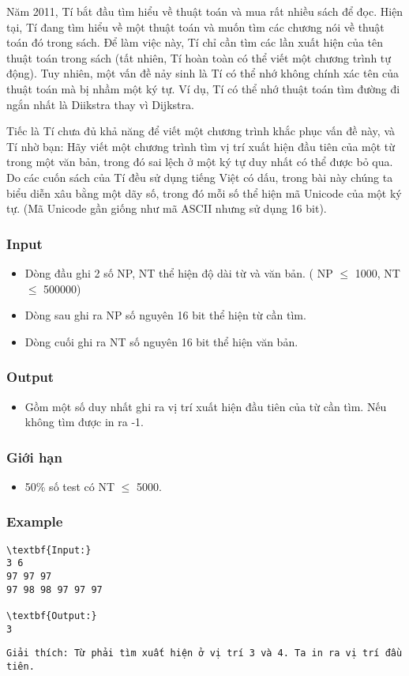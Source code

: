 

Năm 2011, Tí bắt đầu tìm hiểu về thuật toán và mua rất nhiều sách để đọc. Hiện tại, Tí đang tìm hiểu về một thuật toán và muốn tìm các chương nói về thuật toán đó trong sách. Để làm việc này, Tí chỉ cần tìm các lần xuất hiện của tên thuật toán trong sách (tất nhiên, Tí hoàn toàn có thể viết một chương trình tự động). Tuy nhiên, một vấn đề nảy sinh là Tí có thể nhớ không chính xác tên của thuật toán mà bị nhầm một ký tự. Ví dụ, Tí có thể nhớ thuật toán tìm đường đi ngắn nhất là Diikstra thay vì Dijkstra.





Tiếc là Tí chưa đủ khả năng để viết một chương trình khắc phục vấn đề này, và Tí nhờ bạn: Hãy viết một chương trình tìm vị trí xuất hiện đầu tiên của một từ trong một văn bản, trong đó sai lệch ở một ký tự duy nhất có thể được bỏ qua. Do các cuốn sách của Tí đều sử dụng tiếng Việt có dấu, trong bài này chúng ta biểu diễn xâu bằng một dãy số, trong đó mỗi số thể hiện mã Unicode của một ký tự. (Mã Unicode gần giống như mã ASCII nhưng sử dụng 16 bit).

\subsubsection{Input}
\begin{itemize}
	\item Dòng đầu ghi 2 số NP, NT thể hiện độ dài từ và văn bản. ( NP  $\le$  1000, NT  $\le$  500000)
\end{itemize}
\begin{itemize}
	\item Dòng sau ghi ra NP số nguyên 16 bit thể hiện từ cần tìm.
\end{itemize}
\begin{itemize}
	\item Dòng cuối ghi ra NT số nguyên 16 bit thể hiện văn bản.
\end{itemize}

\subsubsection{Output}
\begin{itemize}
	\item Gồm một số duy nhất ghi ra vị trí xuất hiện đầu tiên của từ cần tìm. Nếu không tìm được in ra -1.
\end{itemize}

\subsubsection{Giới hạn}
\begin{itemize}
	\item 50\% số test có NT  $\le$  5000.
\end{itemize}

\subsubsection{Example}
\begin{verbatim}
\textbf{Input:}
3 6
97 97 97
97 98 98 97 97 97

\textbf{Output:}
3\end{verbatim}
\begin{verbatim}
Giải thích: Từ phải tìm xuất hiện ở vị trí 3 và 4. Ta in ra vị trí đầu tiên.\end{verbatim}
